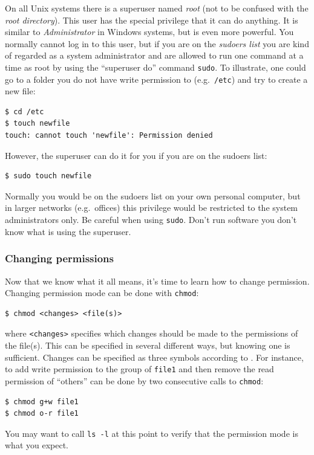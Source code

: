 On all Unix systems there is a superuser named \emph{root} (not to be confused with the \emph{root directory}). This user has the special privilege that it can do anything. It is similar to \emph{Administrator} in Windows systems, but is even more powerful. You normally cannot log in to this user, but if you are on the \emph{sudoers list} you are kind of regarded as a system administrator and are allowed to run one command at a time as root by using the ``superuser do'' command \verb|sudo|. To illustrate, one could go to a folder you do not have write permission to (e.g.\ \verb|/etc|) and try to create a new file:

\begin{verbatim}
$ cd /etc
$ touch newfile
touch: cannot touch 'newfile': Permission denied
\end{verbatim}
However, the superuser can do it for you if you are on the sudoers list:

\begin{verbatim}
$ sudo touch newfile
\end{verbatim}
Normally you would be on the sudoers list on your own personal computer, but in larger networks (e.g.\ offices) this privilege would be restricted to the system administrators only. Be careful when using \verb|sudo|. Don't run software you don't know what is using the superuser.

\subsubsection{Changing permissions}
Now that we know what it all means, it's time to learn how to change permission. Changing permission mode can be done with \verb|chmod|:

\begin{verbatim}
$ chmod <changes> <file(s)>
\end{verbatim}
where \verb|<changes>| specifies which changes should be made to the permissions of the file(s). This can be specified in several different ways, but knowing one is sufficient. Changes can be specified as three symbols according to . For instance, to add write permission to the group of \verb|file1| and then remove the read permission of ``others'' can be done by two consecutive calls to \verb|chmod|:

\begin{verbatim}
$ chmod g+w file1
$ chmod o-r file1
\end{verbatim}
You may want to call \verb|ls -l| at this point to verify that the permission mode is what you expect.

